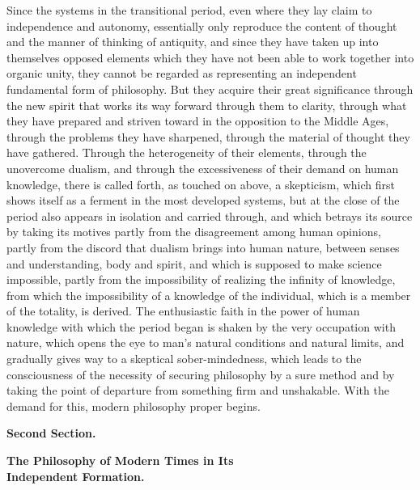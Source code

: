 Since the systems in the transitional period, even where they lay claim
to independence and autonomy, essentially only reproduce the content of
thought and the manner of thinking of antiquity, and since they have
taken up into themselves opposed elements which they have not been able
to work together into organic unity, they cannot be regarded as
representing an independent fundamental form of philosophy.
But they acquire their great significance through the new spirit that
works its way forward through them to clarity, through what they have
prepared and striven toward in the opposition to the Middle Ages,
through the problems they have sharpened, through the material of
thought they have gathered. Through the heterogeneity of their elements,
through the unovercome dualism, and through the excessiveness of their
demand on human knowledge, there is called forth, as touched on above, a
skepticism, which first shows itself as a ferment in the most developed
systems, but at the close of the period also appears in isolation and
carried through, and which betrays its source by taking its motives
partly from the disagreement among human opinions, partly from the
discord that dualism brings into human nature, between senses and
understanding, body and spirit, and which is supposed to make science
impossible, partly from the impossibility of realizing the infinity of
knowledge, from which the impossibility of a knowledge of the
individual, which is a member of the totality, is derived. The
enthusiastic faith in the power of human knowledge with which the period
began is shaken by the very occupation with nature, which opens the eye
to man's natural conditions and natural limits, and gradually gives way
to a skeptical sober-mindedness, which leads to the consciousness of the
necessity of securing philosophy by a sure method and by taking the
point of departure from something firm and unshakable. With the demand
for this, modern philosophy proper begins.

\dblrule

\begin{center}
  \textbf{\large Second Section.}
\end{center}

\begin{center}
  \textbf{The Philosophy of Modern Times in Its\\
  Independent Formation.}
\end{center}

\divrule

